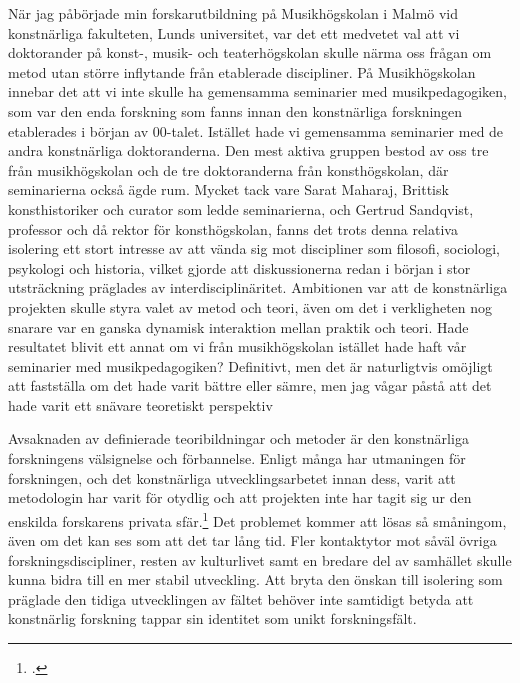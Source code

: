 \documentclass[11pt]{article}
\begin{document}
När jag påbörjade min forskarutbildning på Musikhögskolan i Malmö vid
konstnärliga fakulteten, Lunds universitet, var det ett medvetet val
att vi doktorander på konst-, musik- och teaterhögskolan skulle närma
oss frågan om metod utan större inflytande från etablerade
discipliner. På Musikhögskolan innebar det att vi inte skulle ha
gemensamma seminarier med musikpedagogiken, som var den enda forskning
som fanns innan den konstnärliga forskningen etablerades i början av
00-talet. Istället hade vi gemensamma seminarier med de andra
konstnärliga doktoranderna. Den mest aktiva gruppen bestod av oss tre
från musikhögskolan och de tre doktoranderna från konsthögskolan, där
seminarierna också ägde rum. Mycket tack vare Sarat Maharaj, Brittisk
konsthistoriker och curator som ledde seminarierna, och Gertrud
Sandqvist, professor och då rektor för konsthögskolan, fanns det trots
denna relativa isolering ett stort intresse av att vända sig mot
discipliner som filosofi, sociologi, psykologi och historia, vilket
gjorde att diskussionerna redan i början i stor utsträckning präglades
av interdisciplinäritet. Ambitionen var att de konstnärliga projekten
skulle styra valet av metod och teori, även om det i verkligheten nog
snarare var en ganska dynamisk interaktion mellan praktik och
teori. Hade resultatet blivit ett annat om vi från musikhögskolan
istället hade haft vår seminarier med musikpedagogiken? Definitivt,
men det är naturligtvis omöjligt att fastställa om det hade varit
bättre eller sämre, men jag vågar påstå att det hade varit ett snävare teoretiskt perspektiv

Avsaknaden av definierade teoribildningar och metoder är den
konstnärliga forskningens välsignelse och förbannelse. Enligt många
har utmaningen för forskningen, och det konstnärliga
utvecklingsarbetet innan dess, varit att metodologin har varit för
otydlig och att projekten inte har tagit sig ur den enskilda
forskarens privata sfär.\footcite[sid. 105]{Dunin2007} Det problemet
kommer att lösas så småningom, även om det kan ses som att det tar
lång tid. Fler kontaktytor mot såväl övriga forskningsdiscipliner,
resten av kulturlivet samt en bredare del av samhället skulle kunna
bidra till en mer stabil utveckling. Att bryta den önskan till
isolering som präglade den tidiga utvecklingen av fältet behöver inte
samtidigt betyda att konstnärlig forskning tappar sin identitet som
unikt forskningsfält.
\end{document}
